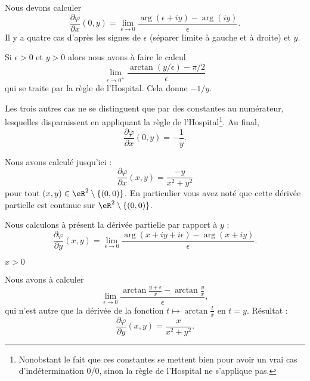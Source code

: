 \begin{normaltext}
\begin{subproof}
             Nous devons calculer
             \begin{equation}
                 \frac{ \partial \varphi }{ \partial x }(0,y)=\lim_{\epsilon\to 0}\frac{ \arg(\epsilon+ iy)-\arg(iy) }{ \epsilon }.
             \end{equation}
             Il y a quatre cas d'après les signes de \( \epsilon\) (séparer limite à gauche et à droite) et \( y\).

             Si \( \epsilon>0\) et \( y>0\) alors nous avons à faire le calcul
             \begin{equation}
                 \lim_{\epsilon\to 0^+}\frac{ \arctan(y/\epsilon)-\pi/2 }{ \epsilon }
             \end{equation}
             qui se traite par la règle de l'Hospital. Cela donne \( -1/y\).

             Les trois autres cas ne se distinguent que par des constantes au numérateur, lesquelles disparaissent en appliquant la règle de l'Hospital\footnote{Nonobstant le fait que ces constantes se mettent bien pour avoir un vrai cas d'indétermination \( 0/0\), sinon la règle de l'Hospital ne s'applique pas.}. Au final,
             \begin{equation}
                 \frac{ \partial \varphi }{ \partial x }(0,y)=-\frac{1}{ y }.
             \end{equation}
    \end{subproof}

    Nous avons calculé jusqu'ici :
    \begin{equation}        \label{EQooAOJPooOrvUBR}
        \frac{ \partial \varphi }{ \partial x }(x,y)=\frac{ -y }{ x^2+y^2 }
    \end{equation}
    pour tout \( (x,y)\in \eR^2\setminus\{ (0,0) \}\). En particulier vous avez noté que cette dérivée partielle est continue sur \( \eR^2\setminus\{ (0,0) \}\).

    Nous calculons à présent la dérivée partielle par rapport à \( y\) :
    \begin{equation}
        \frac{ \partial \varphi }{ \partial y }(x,y)=\lim_{\epsilon\to 0}\frac{ \arg(x+iy+i\epsilon)-\arg(x+iy) }{ \epsilon }.
    \end{equation}

    \begin{subproof}

        \item[\( x>0\)]

            Nous avons à calculer
            \begin{equation}
                \lim_{\epsilon\to 0}\frac{ \arctan\frac{ y+\epsilon }{ x }-\arctan\frac{ y }{ x } }{ \epsilon },
            \end{equation}
            qui n'est autre que la dérivée de la fonction \( t\mapsto\arctan\frac{ t }{ x }\) en \( t=y\). Résultat :
            \begin{equation}
                \frac{ \partial \varphi }{ \partial y }(x,y)=\frac{ x }{ x^2+y^2 }.
            \end{equation}


\end{subproof}
\end{normaltext}
